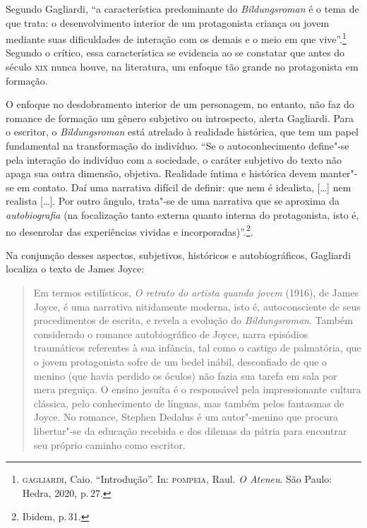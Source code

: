 Segundo Gagliardi, ``a característica predominante do
\textit{Bildungsroman} é o tema de que
trata: o desenvolvimento interior de um protagonista criança ou jovem
mediante suas dificuldades de interação com os demais e o meio em que vive''.\footnote{\textsc{gagliardi}, Caio. ``Introdução''. In: \textsc{pompeia}, Raul. \textit{O Ateneu}. São Paulo: Hedra, 2020, p.\,27.} Segundo o crítico, essa característica se evidencia ao se constatar que antes do século \textsc{xix} nunca houve, na literatura, um enfoque tão grande no protagonista em formação.

O enfoque no desdobramento interior de um personagem, no entanto, não faz do romance de formação um gênero subjetivo ou introspecto, alerta Gagliardi. 
Para o escritor, o \textit{Bildungsroman} está atrelado à realidade histórica, que tem um papel fundamental na transformação do indivíduo. ``Se o autoconhecimento define"-se
pela interação do indivíduo com a sociedade, o caráter subjetivo do
texto não apaga sua outra dimensão, objetiva. Realidade íntima e
histórica devem manter"-se em contato. Daí uma narrativa difícil de
definir: que nem é idealista, [\ldots] nem realista [\ldots]. Por outro ângulo, trata"-se de uma narrativa que se aproxima da \textit{autobiografia} (na focalização tanto externa 
quanto interna do protagonista, isto é, no desenrolar das experiências vividas e incorporadas)''.\footnote{Ibidem, p.\,31.}.

Na conjunção desses aspectos, subjetivos, históricos e autobiográficos, Gagliardi localiza o texto de James Joyce:

\begin{quote}
Em termos estilísticos, \textit{O retrato do
artista quando jovem} (1916), de James Joyce, é uma
narrativa nitidamente moderna, isto é, autoconsciente de seus
procedimentos de escrita, e revela a evolução do
\textit{Bildungsroman}. Também considerado o
romance autobiográfico de Joyce, narra episódios traumáticos referentes
à sua infância, tal como o castigo de palmatória, que o jovem
protagonista sofre de um bedel inábil, desconfiado de que o menino (que
havia perdido os óculos) não fazia sua tarefa em sala por mera
preguiça. O ensino jesuíta é o responsável pela impressionante cultura
clássica, pelo conhecimento de línguas, mas também pelos fantasmas de
Joyce. No romance, Stephen Dedalus é um autor"-menino que procura
libertar"-se da educação recebida e dos dilemas da pátria para
encontrar seu próprio caminho como
escritor.
\end{quote}

